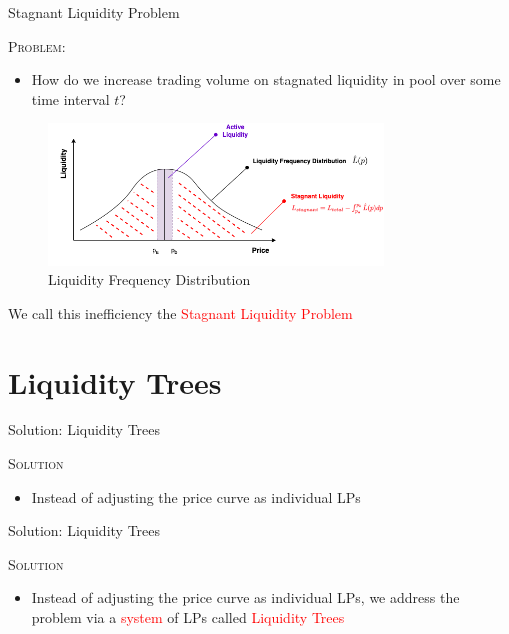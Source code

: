\documentclass[10pt,xcolor=svgnames]{beamer} %
\newcommand{\red}[1]{\textcolor{red}{#1}}
\begin{document}
\begin{frame}{Stagnant Liquidity Problem} 

\begin{exampleblock}{\textsc{Problem:}}
\begin{itemize}
  \item How do we increase trading volume on stagnated liquidity in pool over some time interval $t$?
\end{itemize}
\end{exampleblock}

\begin{figure}[h!]
\includegraphics[width=3.5in]{img/freq3.png}
\caption{ Liquidity Frequency Distribution} 
\label{fig:full_tree}
\end{figure}

\begin{exampleblock}{}
We call this inefficiency the \red{Stagnant Liquidity Problem}
\end{exampleblock}

\end{frame}

\section{Liquidity Trees}

\begin{frame}{Solution: Liquidity Trees} 

\begin{exampleblock}{\textsc{Solution}}
\begin{itemize}
  \item Instead of adjusting the price curve as individual LPs
\end{itemize}
\end{exampleblock}

\vspace{7cm}

\end{frame}


\begin{frame}{Solution: Liquidity Trees} 

\begin{exampleblock}{\textsc{Solution}}
\begin{itemize}
  \item Instead of adjusting the price curve as individual LPs, we address the problem via a \red{system} of LPs called \red{Liquidity Trees}
\end{itemize}
\end{exampleblock}

\vspace{7cm}

\end{frame}
\end{document}
